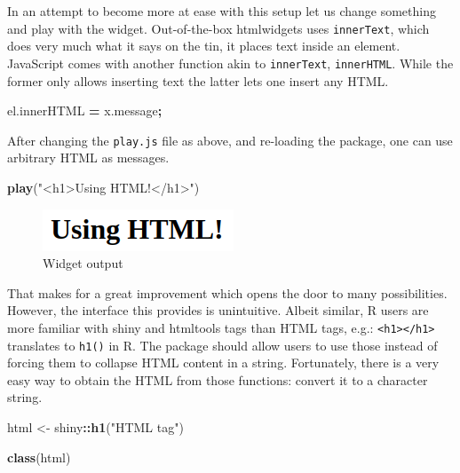 \documentclass[
]{krantz}
\makeatletter
\newenvironment{Shaded}{\begin{snugshade}}{\end{snugshade}}
\newcommand{\AttributeTok}[1]{\textcolor[rgb]{0.61,0.61,0.61}{#1}}
\newcommand{\KeywordTok}[1]{\textcolor[rgb]{0.27,0.27,0.27}{\textbf{#1}}}
\newcommand{\NormalTok}[1]{#1}
\newcommand{\OperatorTok}[1]{\textcolor[rgb]{0.43,0.43,0.43}{\textbf{#1}}}
\newcommand{\StringTok}[1]{\textcolor[rgb]{0.5,0.5,0.5}{#1}}
\newcommand{\VariableTok}[1]{\textcolor[rgb]{0,0,0}{#1}}
\newenvironment{kframe}{%
\medskip{}
\setlength{\fboxsep}{.8em}
 \def\at@end@of@kframe{}%
 \ifinner\ifhmode%
  \def\at@end@of@kframe{\end{minipage}}%
  \begin{minipage}{\columnwidth}%
 \fi\fi%
 \def\FrameCommand##1{\hskip\@totalleftmargin \hskip-\fboxsep
 \colorbox{shadecolor}{##1}\hskip-\fboxsep
     \hskip-\linewidth \hskip-\@totalleftmargin \hskip\columnwidth}%
 \MakeFramed {\advance\hsize-\width
   \@totalleftmargin\z@ \linewidth\hsize
   \@setminipage}}%
 {\par\unskip\endMakeFramed%
 \at@end@of@kframe}
\renewenvironment{Shaded}{\begin{kframe}}{\end{kframe}}
\makeatother
\begin{document}
In an attempt to become more at ease with this setup let us change something and play with the widget. Out-of-the-box htmlwidgets uses \texttt{innerText}, which does very much what it says on the tin, it places text inside an element. JavaScript comes with another function akin to \texttt{innerText}, \texttt{innerHTML}. While the former only allows inserting text the latter lets one insert any HTML.

\begin{Shaded}
\begin{Highlighting}[]
\VariableTok{el}\NormalTok{.}\AttributeTok{innerHTML} \OperatorTok{=} \VariableTok{x}\NormalTok{.}\AttributeTok{message}\OperatorTok{;}
\end{Highlighting}
\end{Shaded}

After changing the \texttt{play.js} file as above, and re-loading the package, one can use arbitrary HTML as messages.

\begin{Shaded}
\begin{Highlighting}[]
\KeywordTok{play}\NormalTok{(}\StringTok{"<h1>Using HTML!</h1>"}\NormalTok{)}
\end{Highlighting}
\end{Shaded}

\begin{figure}
\centering
\includegraphics{images/playground-h1.png}
\caption{Widget output}
\end{figure}

That makes for a great improvement which opens the door to many possibilities. However, the interface this provides is unintuitive. Albeit similar, R users are more familiar with shiny and htmltools \citep{R-htmltools} tags than HTML tags, e.g.: \texttt{\textless{}h1\textgreater{}\textless{}/h1\textgreater{}} translates to \texttt{h1()} in R. The package should allow users to use those instead of forcing them to collapse HTML content in a string. Fortunately, there is a very easy way to obtain the HTML from those functions: convert it to a character string.

\begin{Shaded}
\begin{Highlighting}[]
\NormalTok{html <{-}}\StringTok{ }\NormalTok{shiny}\OperatorTok{::}\KeywordTok{h1}\NormalTok{(}\StringTok{"HTML tag"}\NormalTok{)}

\KeywordTok{class}\NormalTok{(html)}
\end{Highlighting}
\end{Shaded}
\end{document}
